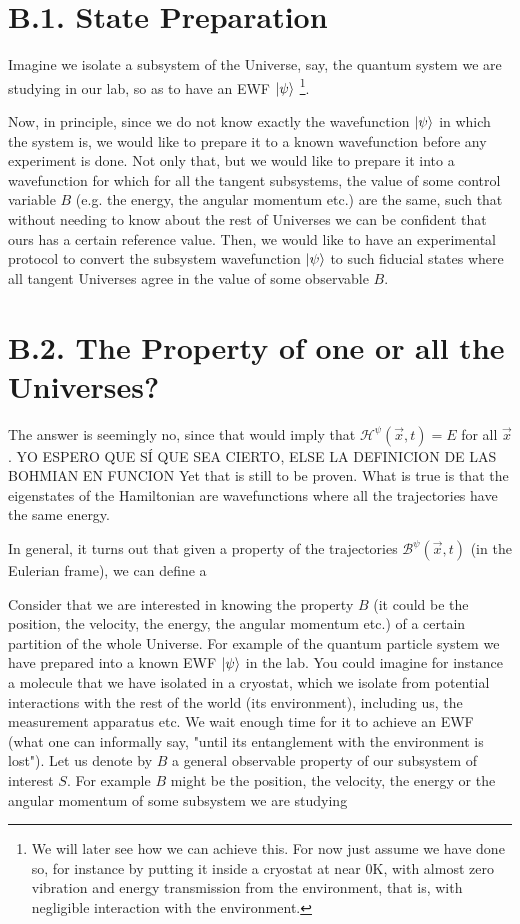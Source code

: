 \documentclass[11pt, a4paper]{article} %
\newcommand{\h}{\mathcal{H}}
\newcommand{\B}{\mathcal{B}}
\begin{document}
\section*{B.1. State Preparation}
Imagine we isolate a subsystem of the Universe, say, the quantum system we are studying in our lab, so as to have an EWF $\ket{\psi}$ \footnote{We will later see how we can achieve this. For now just assume we have done so, for instance by putting it inside a cryostat at near 0K, with almost zero vibration and energy transmission from the environment, that is, with negligible interaction with the environment.}. 

Now, in principle, since we do not know exactly the wavefunction $\ket{\psi}$ in which the system is, we would like to prepare it to a known wavefunction before any experiment is done. Not only that, but we would like to prepare it into a wavefunction for which for all the tangent subsystems, the value of some control variable $B$ (e.g. the energy, the angular momentum etc.) are the same, such that without needing to know about the rest of Universes we can be confident that ours has a certain reference value. Then, we would like to have an experimental protocol to convert the subsystem wavefunction $\ket{\psi}$ to such fiducial states where all tangent Universes agree in the value of some observable $B$.


\section*{B.2. The Property of one or all the Universes?}





The answer is seemingly no, since that would imply that $\h^\psi(\vec{x},t)=E$ for all $\vec{x}$. YO ESPERO QUE SÍ QUE SEA CIERTO, ELSE LA DEFINICION DE LAS BOHMIAN EN FUNCION Yet that is still to be proven. What is true is that the eigenstates of the Hamiltonian are wavefunctions where all the trajectories have the same energy. 

In general, it turns out that given a property of the trajectories $\B^\psi(\vec{x},t)$ (in the Eulerian frame), we can define a


Consider that we are interested in knowing the property $B$ (it could be the position, the velocity, the energy, the angular momentum etc.) of a certain partition of the whole Universe. For example of the quantum particle system we have prepared into a known EWF $\ket{\psi}$ in the lab. You could imagine for instance a molecule that we have isolated in a cryostat, which we isolate from potential interactions with the rest of the world (its environment), including us, the measurement apparatus etc. We wait enough time for it to achieve an EWF (what one can informally say, "until its entanglement with the environment is lost"). 
Let us denote by $B$ a general observable property of our subsystem of interest $S$. For example $B$ might be the position, the velocity, the energy or the angular momentum of some subsystem we are studying
\end{document}
